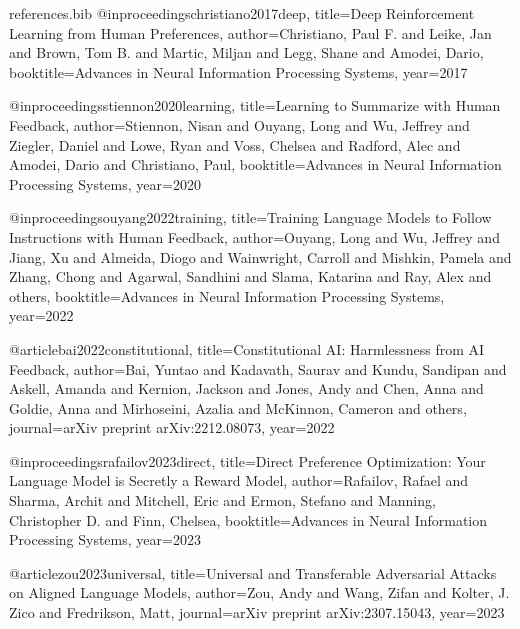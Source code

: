 %
%

\begin{filecontents*}{references.bib}
@inproceedings{christiano2017deep,
  title={Deep Reinforcement Learning from Human Preferences},
  author={Christiano, Paul F. and Leike, Jan and Brown, Tom B. and Martic, Miljan and Legg, Shane and Amodei, Dario},
  booktitle={Advances in Neural Information Processing Systems},
  year={2017}
}

@inproceedings{stiennon2020learning,
  title={Learning to Summarize with Human Feedback},
  author={Stiennon, Nisan and Ouyang, Long and Wu, Jeffrey and Ziegler, Daniel and Lowe, Ryan and Voss, Chelsea and Radford, Alec and Amodei, Dario and Christiano, Paul},
  booktitle={Advances in Neural Information Processing Systems},
  year={2020}
}

@inproceedings{ouyang2022training,
  title={Training Language Models to Follow Instructions with Human Feedback},
  author={Ouyang, Long and Wu, Jeffrey and Jiang, Xu and Almeida, Diogo and Wainwright, Carroll and Mishkin, Pamela and Zhang, Chong and Agarwal, Sandhini and Slama, Katarina and Ray, Alex and others},
  booktitle={Advances in Neural Information Processing Systems},
  year={2022}
}

@article{bai2022constitutional,
  title={Constitutional AI: Harmlessness from AI Feedback},
  author={Bai, Yuntao and Kadavath, Saurav and Kundu, Sandipan and Askell, Amanda and Kernion, Jackson and Jones, Andy and Chen, Anna and Goldie, Anna and Mirhoseini, Azalia and McKinnon, Cameron and others},
  journal={arXiv preprint arXiv:2212.08073},
  year={2022}
}

@inproceedings{rafailov2023direct,
  title={Direct Preference Optimization: Your Language Model is Secretly a Reward Model},
  author={Rafailov, Rafael and Sharma, Archit and Mitchell, Eric and Ermon, Stefano and Manning, Christopher D. and Finn, Chelsea},
  booktitle={Advances in Neural Information Processing Systems},
  year={2023}
}

@article{zou2023universal,
  title={Universal and Transferable Adversarial Attacks on Aligned Language Models},
  author={Zou, Andy and Wang, Zifan and Kolter, J. Zico and Fredrikson, Matt},
  journal={arXiv preprint arXiv:2307.15043},
  year={2023}
}


\end{filecontents*}
